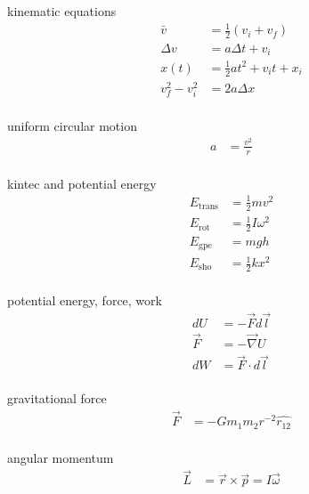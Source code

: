 \documentclass[avery5388, frame, grid]{flashcards}
\begin{document}
\begin{flashcard}{kinematic equations}
  {\begin{align*}
    \bar{v} &= \frac{1}{2} (v_{i} + v_{f})\\
    \Delta v &= a \Delta t + v_{i}\\
    x(t) &= \frac{1}{2} a t^{2} + v_{i} t + x_{i}\\
    v_{f}^{2} - v_{i}^{2} &= 2 a \Delta x\\
  \end{align*}}
\end{flashcard}

\begin{flashcard}{uniform circular motion}
  {\begin{align*}
      a &= \frac{v^{2}}{r}\\
  \end{align*}}
\end{flashcard}

\begin{flashcard}{kintec and potential energy}
  {
    \begin{align*}
      E_{\textrm{trans}} &= \frac{1}{2} m v^{2}\\
      E_{\textrm{rot}} &= \frac{1}{2} I \omega^{2}\\
      E_{\textrm{gpe}} &= m g h\\
      E_{\textrm{sho}} &= \frac{1}{2} k x^{2}\\
    \end{align*}
  }
\end{flashcard}

\begin{flashcard}{potential energy, force, work}
  {
    \begin{align*}
       dU &= -\vec{F} d\vec{l}\\
      \vec{F} &= - \vec{\nabla} U\\
      dW &= \vec{F} \cdot d\vec{l}\\
    \end{align*}
  }
\end{flashcard}

\begin{flashcard}{gravitational force}
  {
    \begin{align*}
      \vec{F} &= - G m_{1} m_{2} r^{-2} \hat{r_{12}}\\
    \end{align*}
  }
\end{flashcard}

\begin{flashcard}{angular momentum}
  {
    \begin{align*}
      \vec{L} &= \vec{r} \times \vec{p} = I \vec{\omega}\\
    \end{align*}
  }
\end{flashcard}
\end{document}
